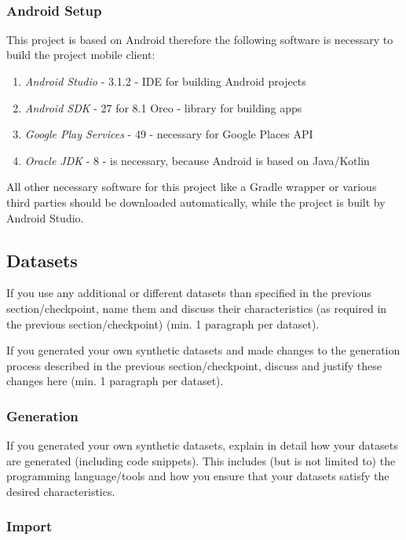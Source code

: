 \


\subsubsection{Android Setup}
\label{sec:Android-Setup}
This project is based on Android therefore the following software is necessary to build the project mobile client:

\begin{enumerate}
	\item \textit{Android Studio} - 3.1.2 - IDE for building Android projects
	\item \textit{Android SDK} - 27 for 8.1 Oreo - library for building apps
	\item \textit{Google Play  Services} - 49 - necessary for Google Places API
	\item \textit{Oracle JDK} - 8 - is necessary, because Android is based on Java/Kotlin
\end{enumerate}

All other necessary software for this project like a Gradle wrapper or various third parties should be downloaded automatically, while the project is built by Android Studio.


\subsection{Datasets}

If you use any additional or different datasets than specified in the previous
section/checkpoint, name them and discuss their characteristics (as required in
the previous section/checkpoint) (min. 1 paragraph per dataset).

If you generated your own synthetic datasets and made changes to the generation
process described in the previous section/checkpoint, discuss and justify these
changes here (min. 1 paragraph per dataset).

\subsubsection{Generation}

If you generated your own synthetic datasets, explain in detail how your
datasets are generated (including code snippets). This includes (but is not
limited to) the programming language/tools and how you ensure that your datasets
satisfy the desired characteristics.

\subsubsection{Import}
\label{sec:Import}

